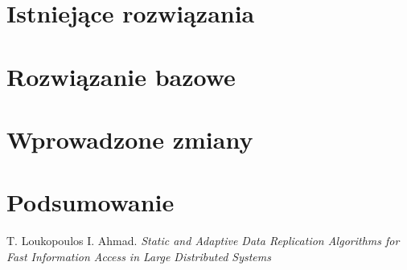 \documentclass[11pt,pdftex,a4paper]{scrartcl}
\begin{document}
\section{Istniejące rozwiązania}

\section{Rozwiązanie bazowe}

\section{Wprowadzone zmiany}

\section{Podsumowanie}

\begin{thebibliography}{}

  T. Loukopoulos I. Ahmad.
  \emph{Static and Adaptive Data Replication Algorithms for Fast Information Access in 
    Large Distributed Systems}

\end{thebibliography}
\end{document}
